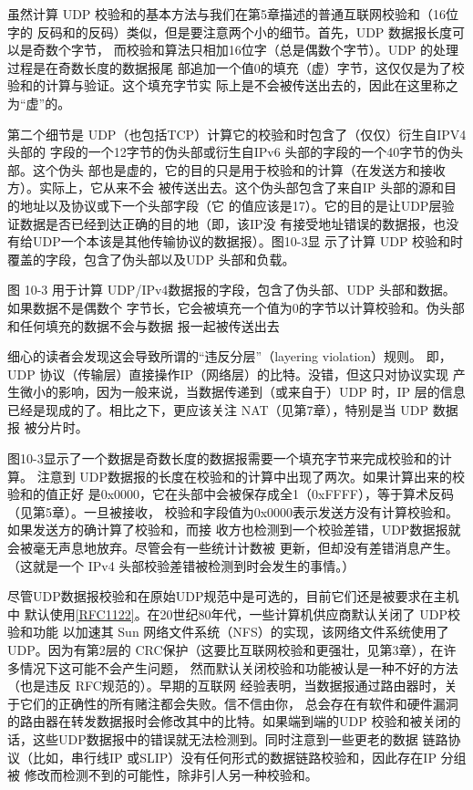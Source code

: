 虽然计算 UDP 校验和的基本方法与我们在第5章描述的普通互联网校验和（16位字的
反码和的反码）类似，但是要注意两个小的细节。首先，UDP 数据报长度可以是奇数个字节，
而校验和算法只相加16位字（总是偶数个字节）。UDP 的处理过程是在奇数长度的数据报尾
部追加一个值0的填充（虚）字节，这仅仅是为了校验和的计算与验证。这个填充字节实
际上是不会被传送出去的，因此在这里称之为“虚”的。

第二个细节是 UDP（也包括TCP）计算它的校验和时包含了（仅仅）衍生自IPV4头部的
字段的一个12字节的伪头部或衍生自IPv6 头部的字段的一个40字节的伪头部。这个伪头
部也是虚的，它的目的只是用于校验和的计算（在发送方和接收方）。实际上，它从来不会
被传送出去。这个伪头部包含了来自IP 头部的源和目的地址以及协议或下一个头部字段（它
的值应该是17）。它的目的是让UDP层验证数据是否已经到达正确的目的地（即，该IP没
有接受地址错误的数据报，也没有给UDP一个本该是其他传输协议的数据报）。图10-3显
示了计算 UDP 校验和时覆盖的字段，包含了伪头部以及UDP 头部和负载。

图 10-3 用于计算 UDP/IPv4数据报的字段，包含了伪头部、UDP 头部和数据。如果数据不是偶数个
字节长，它会被填充一个值为0的字节以计算校验和。伪头部和任何填充的数据不会与数据
报一起被传送出去


\begin{tcolorbox}    
    细心的读者会发现这会导致所谓的“违反分层”（layering violation）规则。
    即，UDP 协议（传输层）直接操作IP（网络层）的比特。没错，但这只对协议实现
    产生微小的影响，因为一般来说，当数据传递到（或来自于）UDP 时，IP 层的信息
    已经是现成的了。相比之下，更应该关注 NAT（见第7章），特别是当 UDP 数据报
    被分片时。
\end{tcolorbox}

图10-3显示了一个数据是奇数长度的数据报需要一个填充字节来完成校验和的计算。
注意到 UDP数据报的长度在校验和的计算中出现了两次。如果计算出来的校验和的值正好
是0x0000，它在头部中会被保存成全1（0xFFFF），等于算术反码（见第5章）。一旦被接收，
校验和字段值为0x0000表示发送方没有计算校验和。如果发送方的确计算了校验和，而接
收方也检测到一个校验差错，UDP数据报就会被毫无声息地放弃。尽管会有一些统计计数被
更新，但却没有差错消息产生。（这就是一个 IPv4 头部校验差错被检测到时会发生的事情。）

尽管UDP数据报校验和在原始UDP规范中是可选的，目前它们还是被要求在主机中
默认使用\href{https://www.rfc-editor.org/rfc/rfc1122}{[RFC1122]}。在20世纪80年代，一些计算机供应商默认关闭了 UDP校验和功能
以加速其 Sun 网络文件系统（NFS）的实现，该网络文件系统使用了 UDP。因为有第2层的
CRC保护（这要比互联网校验和更强壮，见第3章），在许多情况下这可能不会产生问题，
然而默认关闭校验和功能被认是一种不好的方法（也是违反 RFC规范的）。早期的互联网
经验表明，当数据报通过路由器时，关于它们的正确性的所有赌注都会失败。信不信由你，
总会存在有软件和硬件漏洞的路由器在转发数据报时会修改其中的比特。如果端到端的UDP
校验和被关闭的话，这些UDP数据报中的错误就无法检测到。同时注意到一些更老的数据
链路协议（比如，串行线IP 或SLIP）没有任何形式的数据链路校验和，因此存在IP 分组被
修改而检测不到的可能性，除非引人另一种校验和。

